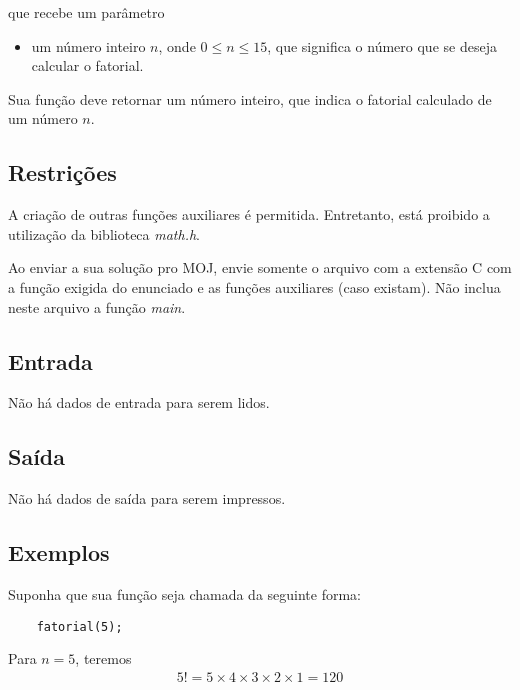 que recebe um parâmetro
\begin{itemize}
	\item um número inteiro $n$, onde $0 \leq n \leq 15$, que significa o número que se deseja calcular o fatorial.
\end{itemize}

Sua função deve retornar um número inteiro, que indica o fatorial calculado de um número $n$.

\subsection*{Restrições}

 A criação de outras funções auxiliares é permitida. Entretanto, está proibido a utilização da biblioteca \textit{math.h}.

 Ao enviar a sua solução pro MOJ, envie somente o arquivo com a extensão C com a função exigida do enunciado e as funções auxiliares (caso existam). Não inclua neste arquivo a função \textit{main}.

\subsection*{Entrada}

Não há dados de entrada para serem lidos.

\subsection*{Saída}

Não há dados de saída para serem impressos.

\subsection*{Exemplos}


Suponha que sua função seja chamada da seguinte forma:

\begin{lstlisting}
	fatorial(5);
\end{lstlisting}

Para $n = 5$, teremos
\begin{equation*}
	\begin{matrix}
		5! = 5 \times 4 \times 3 \times 2 \times 1 = 120
	\end{matrix}
\end{equation*}

